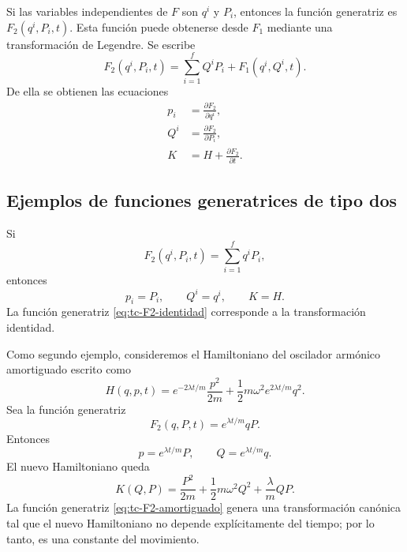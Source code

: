 \documentclass[../apunte_mecanica_clasica.tex]{subfiles}
\begin{document}
Si las variables independientes de \(F\) son \(q^i\) y \(P_i\), entonces la función generatriz es \(F_2(q^i,P_i,t)\). Esta función puede obtenerse desde \(F_1\) mediante una transformación de Legendre. Se escribe
\begin{equation}
    F_2(q^i,P_i,t)=\sum_{i=1}^{f}Q^iP_i+F_1(q^i,Q^i,t).
    \label{eq:tc-F2-def}
\end{equation}
De ella se obtienen las ecuaciones
\begin{subequations}
\label{eq:tc-F2-ecuaciones}
\begin{align}
    p_i&=\frac{\partial F_2}{\partial q^i},
    \label{eq:tc-F2-p}\\
    Q^i&=\frac{\partial F_2}{\partial P_i},
    \label{eq:tc-F2-Q}\\
    K&=H+\frac{\partial F_2}{\partial t}.
    \label{eq:tc-F2-K}
\end{align}
\end{subequations}

\subsection{Ejemplos de funciones generatrices de tipo dos}
\label{subsec:tc-ejemplos-F2}

Si
\begin{equation}
    F_2(q^i,P_i,t)=\sum_{i=1}^{f}q^iP_i,
    \label{eq:tc-F2-identidad}
\end{equation}
entonces
\begin{equation}
    p_i=P_i,
    \qquad
    Q^i=q^i,
    \qquad
    K=H.
    \label{eq:tc-F2-identidad-transformacion}
\end{equation}
La función generatriz \eqref{eq:tc-F2-identidad} corresponde a la transformación identidad.

Como segundo ejemplo, consideremos el Hamiltoniano del oscilador armónico amortiguado escrito como
\begin{equation}
    H(q,p,t)=e^{-2\lambda t/m}\frac{p^2}{2m}
    +\frac{1}{2}m\omega^2e^{2\lambda t/m}q^2.
    \label{eq:tc-H-amortiguado}
\end{equation}
Sea la función generatriz
\begin{equation}
    F_2(q,P,t)=e^{\lambda t/m}qP.
    \label{eq:tc-F2-amortiguado}
\end{equation}
Entonces
\begin{equation}
    p=e^{\lambda t/m}P,
    \qquad
    Q=e^{\lambda t/m}q.
    \label{eq:tc-transformacion-amortiguado}
\end{equation}
El nuevo Hamiltoniano queda
\begin{equation}
    K(Q,P)=\frac{P^2}{2m}+\frac{1}{2}m\omega^2Q^2+\frac{\lambda}{m}QP.
    \label{eq:tc-K-amortiguado}
\end{equation}
La función generatriz \eqref{eq:tc-F2-amortiguado} genera una transformación canónica tal que el nuevo Hamiltoniano no depende explícitamente del tiempo; por lo tanto, es una constante del movimiento.
\end{document}
